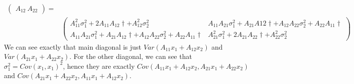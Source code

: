 \documentclass[12pt,a4paper]{article}
\theoremstyle{definition}
\begin{document}
\begin{enumerate}[label=\roman*)]
\begin{equation*}
\begin{split}
\begin{pmatrix}
            A_{12} \ A_{22}
        \end{pmatrix}=\\
        &
        \begin{pmatrix}
            A_{11}^2\sigma_1^2+2A_{11}A_{12}\dagger+A_{12}^2\sigma_2^2 & A_{11}A_{21}\sigma_1^2+A_{21}A{12}\dagger+A_{12}A_{22}\sigma_2^2+A_{22}A_{11}\dagger\\
            A_{11}A_{21}\sigma_1^2+A_{21}A_{12}\dagger+A_{12}A_{22}\sigma_2^2+A_{22}A_{11}\dagger & A_{21}^2\sigma_1^2 + 2A_{21}A_{22}\dagger + A_{22}^2\sigma_2^2
        \end{pmatrix}
    \end{split}
    \end{equation*}
    We can see exactly that main diagonal is just $Var(A_{11}x_1+A_{12}x_2)$ and $Var(A_{21}x_1+A_{22}x_2)$. For the other diagonal, we can see that $\sigma_1^2=Cov(x_1,x_1)^2$, hence they are exactly $Cov(A_{11}x_1+A_{12}x_2, A_{21}x_1+A_{22}x_2)$ and $Cov(A_{21}x_1+A_{22}x_2,A_{11}x_1+A_{12}x_2)$.


\end{enumerate}
\end{document}
